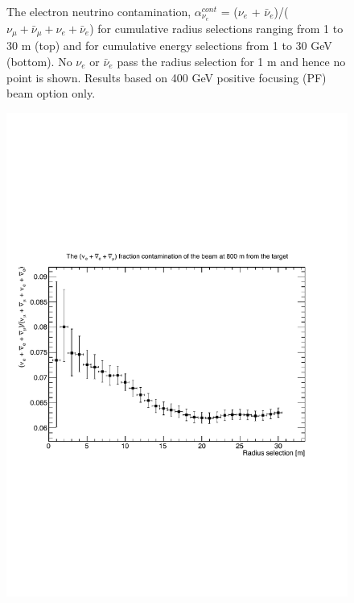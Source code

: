 \begin{figure}[htbp]
\begin{center}
      \caption{The electron neutrino contamination, $\alpha_{\nu_{e}}^{cont}$ = ($\nu_{e}$ + $\bar{\nu}_{e}$)/($\nu_{\mu} + \bar{\nu}_{\mu} + \nu_{e} + \bar{\nu}_{e}$) for cumulative radius selections ranging from 1 to 30 m (top) and for cumulative energy selections from 1 to 30 GeV (bottom). No $\nu_{e}$ or $\bar{\nu}_{e}$ pass the radius selection for 1 m and hence no point is shown. Results based on 400 GeV positive focusing (PF) beam option only.}
    \label{fig:nueContamination}
\end{center}
\end{figure}

\begin{figure}[htbp]
\begin{center}
 	\includegraphics[width=120mm]{Chapter3/figures/400GeV_PF_nueAndNueBarAndNumuBarRatio_RadiusCuts.pdf}

\end{center}
\end{figure}
